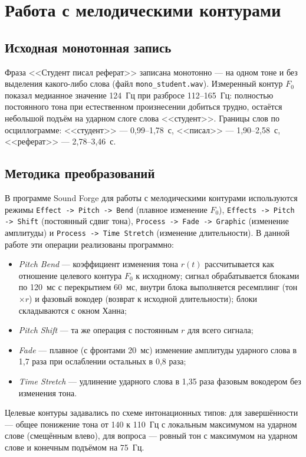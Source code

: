 \section{Работа с мелодическими контурами}

\subsection{Исходная монотонная запись}

Фраза <<Студент писал реферат>> записана монотонно --- на одном тоне и
без выделения какого-либо слова (файл \texttt{mono\_student.wav}).
Измеренный контур $F_0$ показал медианное значение 124~Гц при разбросе
112--165~Гц: полностью постоянного тона при естественном произнесении
добиться трудно, остаётся небольшой подъём на ударном слоге слова
<<студент>>. Границы слов по осциллограмме: <<студент>> ---
0,99--1,78~с, <<писал>> --- 1,90--2,58~с, <<реферат>> ---
2,78--3,46~с.

\subsection{Методика преобразований}

В программе Sound Forge для работы с мелодическими контурами
используются режимы \texttt{Effect -> Pitch -> Bend} (плавное изменение
$F_0$), \texttt{Effects -> Pitch -> Shift} (постоянный сдвиг тона),
\texttt{Process -> Fade -> Graphic} (изменение амплитуды) и
\texttt{Process -> Time Stretch} (изменение длительности). В данной
работе эти операции реализованы программно:
\begin{itemize}
	\item \emph{Pitch Bend} --- коэффициент изменения тона $r(t)$
	рассчитывается как отношение целевого контура $F_0$ к исходному;
	сигнал обрабатывается блоками по 120~мс с перекрытием 60~мс, внутри
	блока выполняется ресемплинг (тон $\times r$) и фазовый вокодер
	(возврат к исходной длительности); блоки складываются с окном Ханна;
	\item \emph{Pitch Shift} --- та же операция с постоянным $r$ для всего
	сигнала;
	\item \emph{Fade} --- плавное (с фронтами 20~мс) изменение амплитуды
	ударного слова в 1,7 раза при ослаблении остальных в 0,8 раза;
	\item \emph{Time Stretch} --- удлинение ударного слова в 1,35 раза
	фазовым вокодером без изменения тона.
\end{itemize}

Целевые контуры задавались по схеме интонационных типов: для
завершённости --- общее понижение тона от 140 к 110~Гц с локальным
максимумом на ударном слове (смещённым влево), для вопроса --- ровный
тон с максимумом на ударном слове и конечным подъёмом на 75~Гц.

